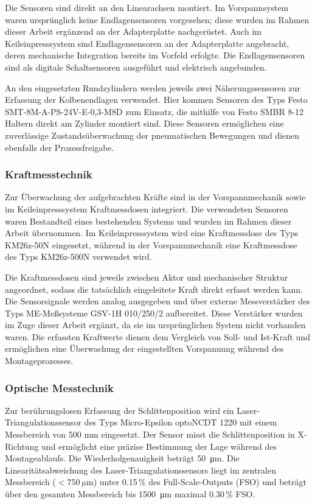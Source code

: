 Die Sensoren sind direkt an den Linearachsen montiert. Im Vorspannsystem waren ursprünglich keine Endlagensensoren vorgesehen; diese wurden im Rahmen dieser Arbeit ergänzend an der Adapterplatte nachgerüstet. Auch im Keileinpresssystem sind Endlagensensoren an der Adapterplatte angebracht, deren mechanische Integration bereits im Vorfeld erfolgte. Die Endlagensensoren sind als digitale Schaltsensoren ausgeführt und elektrisch angebunden.

An den eingesetzten Rundzylindern werden jeweils zwei Näherungssensoren zur Erfassung der Kolbenendlagen verwendet. Hier kommen Sensoren des Typs Festo SMT-8M-A-PS-24V-E-0,3-M8D zum Einsatz, die mithilfe von Festo SMBR 8-12 Haltern direkt am Zylinder montiert sind. Diese Sensoren ermöglichen eine zuverlässige Zustandsüberwachung der pneumatischen Bewegungen und dienen ebenfalls der Prozessfreigabe.\cite{ds_festo_smt8m, ds_festo_smbr}

\subsubsection{Kraftmesstechnik}
Zur Überwachung der aufgebrachten Kräfte sind in der Vorspannmechanik sowie im Keileinpresssystem Kraftmessdosen integriert. Die verwendeten Sensoren waren Bestandteil eines bestehenden Systems und wurden im Rahmen dieser Arbeit übernommen. Im Keileinpresssystem wird eine Kraftmessdose des Typs KM26z-50N eingesetzt, während in der Vorspannmechanik eine Kraftmessdose des Typs KM26z-500N verwendet wird.\cite{ds_km26z_50n, ds_km26z_500n}

Die Kraftmessdosen sind jeweils zwischen Aktor und mechanischer Struktur angeordnet, sodass die tatsächlich eingeleitete Kraft direkt erfasst werden kann. Die Sensorsignale werden analog ausgegeben und über externe Messverstärker des Typs ME-Meßsysteme GSV-1H 010/250/2 aufbereitet. Diese Verstärker wurden im Zuge dieser Arbeit ergänzt, da sie im ursprünglichen System nicht vorhanden waren. Die erfassten Kraftwerte dienen dem Vergleich von Soll- und Ist-Kraft und ermöglichen eine Überwachung der eingestellten Vorspannung während des Montageprozesses.\cite{ds_me_gsv1h}

\subsubsection{Optische Messtechnik}
Zur berührungslosen Erfassung der Schlittenposition wird ein Laser-Triangulationssensor des Typs Micro-Epsilon optoNCDT 1220 mit einem Messbereich von 500 mm eingesetzt. Der Sensor misst die Schlittenposition in X-Richtung und ermöglicht eine präzise Bestimmung der Lage während des Montageablaufs. Die Wiederholgenauigkeit beträgt \qty{50}{\micro\metre}. Die Linearitätsabweichung des Laser-Triangulationssensors liegt im zentralen Messbereich ($< \qty{750}{\micro\metre}$) unter \num{0,15}\,\% des Full-Scale-Outputs (FSO) und beträgt über den gesamten Messbereich bis \qty{1500}{\micro\metre} maximal \num{0,30}\,\% FSO.

